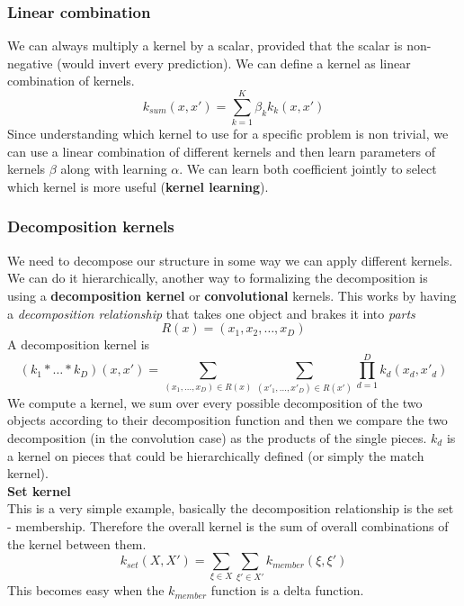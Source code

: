         \subsubsection{Linear combination}
            We can always multiply a kernel by a scalar, provided that the scalar is non-negative (would invert every prediction). We can define a kernel as linear combination of kernels. 
    		$$k_{sum}(x, x') = \sum_{k=1}^K\beta_k k_k(x,x')$$
            Since understanding which kernel to use for a specific problem is non trivial, we can use a linear combination of different kernels and then learn parameters of kernels $\beta$ along with learning $\alpha$. 
            We can learn both coefficient jointly to select which kernel is more useful (\textbf{kernel learning}). 

        \subsubsection{Decomposition kernels}
            We need to decompose our structure in some way we can apply different kernels. 
            We can do it hierarchically, another way to formalizing the decomposition is using a \textbf{decomposition kernel} or \textbf{convolutional} kernels. 
            This works by having a \textit{decomposition relationship} that takes one object and brakes it into \textit{parts} 
            $$R(x)= (x_1, x_2, \dots, x_D)$$
            A decomposition kernel is 
            $$(k_1 * \dots * k_D)(x, x') = 
                \sum _{(x_1, \dots, x_D) \in R(x)} \sum _{(x'_1, \dots, x'_D) \in R(x')} 
                \prod_{d=1} ^ D k_d(x_d, x'_d) $$
            We compute a kernel, we sum over every possible decomposition of the two objects according to their decomposition function and then we compare the two decomposition (in the convolution case) as the products of the single pieces. 
            $k_d$ is a kernel on pieces that could be hierarchically defined (or simply the match kernel).\\ 

            \textbf{Set kernel}\\
            This is a very simple example, basically the decomposition relationship is the set - membership. Therefore the overall kernel is the sum of overall combinations of the kernel between them. 
            $$k_{set} (X, X') = \sum _{\xi \in X} \sum _{\xi' \in X'} k_{member} (\xi, \xi')$$
            This becomes easy when the $k_{member}$ function is a delta function. 

